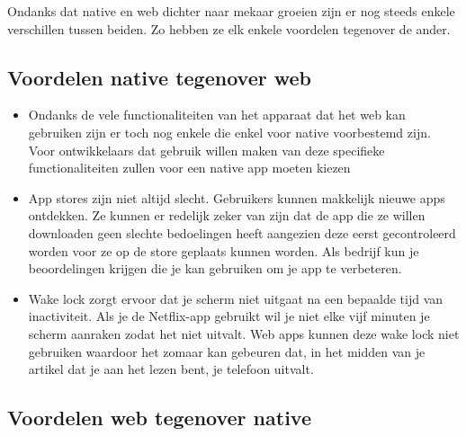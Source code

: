 	\clearpage
	Ondanks dat native en web dichter naar mekaar groeien zijn er nog steeds enkele verschillen tussen beiden. Zo hebben ze elk enkele voordelen tegenover de ander.

\subsection{Voordelen native tegenover web}	
\begin{itemize}  
	\item Ondanks de vele functionaliteiten van het apparaat dat het web kan gebruiken zijn er toch nog enkele die enkel voor native voorbestemd zijn. Voor ontwikkelaars dat gebruik willen maken van deze specifieke functionaliteiten zullen voor een native app moeten kiezen
	\item App stores zijn niet altijd slecht. Gebruikers kunnen makkelijk nieuwe apps ontdekken. Ze kunnen er redelijk zeker van zijn dat de app die ze willen downloaden geen slechte bedoelingen heeft aangezien deze eerst gecontroleerd worden voor ze op de store geplaats kunnen worden. Als bedrijf kun je beoordelingen krijgen die je kan gebruiken om je app te verbeteren.
	\item Wake lock zorgt ervoor dat je scherm niet uitgaat na een bepaalde tijd van inactiviteit. Als je de Netflix-app gebruikt wil je niet elke vijf minuten je scherm aanraken zodat het niet uitvalt. Web apps kunnen deze wake lock niet gebruiken waardoor het zomaar kan gebeuren dat, in het midden van je artikel dat je aan het lezen bent, je telefoon uitvalt.
\end{itemize}

\subsection{Voordelen web tegenover native}	
	
